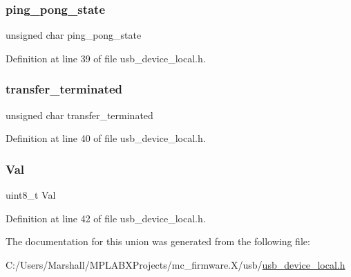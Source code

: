 \mbox{\label{union_e_p___s_t_a_t_u_s_af0b1bd7b5767b174b8f055d94cac4bcc}} 
\subsubsection{\texorpdfstring{ping\_pong\_state}{ping\_pong\_state}}
{\footnotesize\ttfamily unsigned char ping\+\_\+pong\+\_\+state}



Definition at line 39 of file usb\+\_\+device\+\_\+local.\+h.

\mbox{\label{union_e_p___s_t_a_t_u_s_a4a20792b6382277d34763fd0157c9f2e}} 
\subsubsection{\texorpdfstring{transfer\_terminated}{transfer\_terminated}}
{\footnotesize\ttfamily unsigned char transfer\+\_\+terminated}



Definition at line 40 of file usb\+\_\+device\+\_\+local.\+h.

\mbox{\label{union_e_p___s_t_a_t_u_s_aa0c179f4462bb12ca1ed40d18c89cda1}} 
\subsubsection{\texorpdfstring{Val}{Val}}
{\footnotesize\ttfamily uint8\+\_\+t Val}



Definition at line 42 of file usb\+\_\+device\+\_\+local.\+h.



The documentation for this union was generated from the following file\+:\begin{DoxyCompactItemize}
\item 
C\+:/\+Users/\+Marshall/\+M\+P\+L\+A\+B\+X\+Projects/mc\+\_\+firmware.\+X/usb/\mbox{\hyperlink{usb__device__local_8h}{usb\+\_\+device\+\_\+local.\+h}}\end{DoxyCompactItemize}
